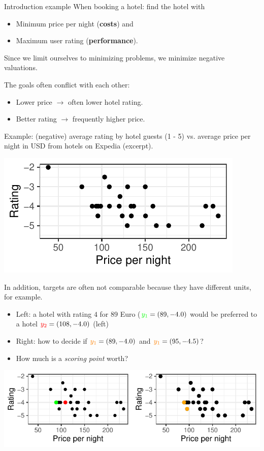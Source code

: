 \begin{frame}[allowframebreaks]{Introduction example}
When booking a hotel: find the hotel with

\begin{itemize}
\item Minimum price per night (\textbf{costs}) and
\item Maximum user rating (\textbf{performance}).
\end{itemize}

\vfill

\begin{footnotesize}
Since we limit ourselves to minimizing problems, we minimize negative valuations.
\end{footnotesize}

\framebreak

The goals often conflict with each other:

\begin{itemize}
\item Lower price $\to$ often lower hotel rating.
\item Better rating $\to$ frequently higher price.
\end{itemize}

Example: (negative) average rating by hotel guests (1 - 5) vs. average price per night in USD from hotels on Expedia (excerpt).

\vspace*{0.2cm}

\centering \includegraphics[width=0.5\linewidth]{images/expedia-1-1}


In addition, targets are often not comparable because they have different units, for example.

\begin{itemize}
\item Left: a hotel with rating $4$ for $89$ Euro ($\textcolor{green}{y_1} = \left(89, - 4.0\right)$ would be preferred to a hotel $\textcolor{red}{y_2} = \left(108, - 4.0\right)$ (left)
\item Right: how to decide if $\textcolor{orange}{y_1} = \left(89, - 4.0\right)$ and $\textcolor{orange}{y_1} = \left(95, - 4.5\right)$?
\item How much is a \textit{scoring point} worth?
\end{itemize}

\centering \includegraphics[width=\linewidth]{images/expedia-2-1}

\end{frame}


